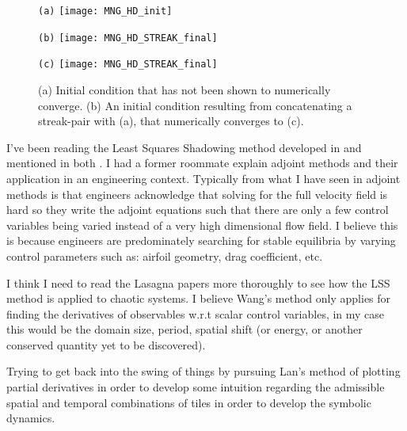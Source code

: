 \begin{itemize}
\begin{figure}
\begin{minipage}[height=.3\textheight]{.32\textwidth}
\centering \small{\texttt{(a)}}
\texttt{[image: MNG\_HD\_init]}
\end{minipage}
\begin{minipage}[height=.3\textheight]{.32\textwidth}
\centering \small{\texttt{(b)}}
\texttt{[image: MNG\_HD\_STREAK\_final]}
\end{minipage}
\begin{minipage}[height=.3\textheight]{.32\textwidth}
\centering \small{\texttt{(c)}}
\texttt{[image: MNG\_HD\_STREAK\_final]}
\end{minipage}
\caption{ \label{fig:MNGhdstreak}
(a) Initial condition that has not been shown to numerically converge. (b) An initial condition
resulting from concatenating a streak-pair with (a), that
numerically converges to (c).
}
\end{figure}


I've been reading the Least Squares Shadowing method developed in 
and mentioned in both . I had a former roommate explain
adjoint methods and their application in an engineering context. Typically from
what I have seen in adjoint methods is that engineers acknowledge that solving
for the full velocity field is hard so they write the adjoint equations such
that there are only a few control variables being varied instead of a very high
dimensional flow field. I believe this is because engineers are predominately
searching for stable equilibria by varying control parameters such as: airfoil
geometry, drag coefficient, etc.

I think I need to read the Lasagna papers more thoroughly to see how the LSS
method is applied to chaotic systems. I believe Wang's method only applies for
finding the derivatives of observables w.r.t scalar control variables, in my
case this would be the domain size, period, spatial shift (or energy, or another
conserved quantity yet to be discovered).

Trying to get back into the swing of things by pursuing Lan's method
of plotting partial derivatives in order to develop some intuition regarding the admissible
spatial and temporal combinations of tiles in order to develop the symbolic dynamics.


\end{itemize}
